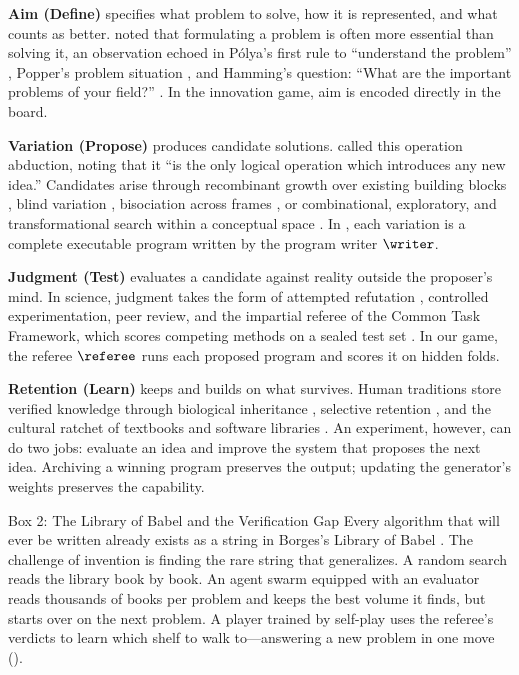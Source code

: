 \textbf{Aim (Define)} specifies what problem to solve, how it is represented, and what counts as better. \citet{einstein1938evolution} noted that formulating a problem is often more essential than solving it, an observation echoed in P\'{o}lya's first rule to ``understand the problem'' \citep{polya1945solve}, Popper's problem situation \citep{popper1963conjectures}, and Hamming's question: ``What are the important problems of your field?'' \citep{hamming1986research}. In the innovation game, aim is encoded directly in the board.

\textbf{Variation (Propose)} produces candidate solutions. \citet[CP 5.171]{peirce1934cp} called this operation abduction, noting that it ``is the only logical operation which introduces any new idea.'' Candidates arise through recombinant growth over existing building blocks \citep{weitzman1998recombinant,arthur2009nature}, blind variation \citep{campbell1960bvsr}, bisociation across frames \citep{koestler1964act}, or combinational, exploratory, and transformational search within a conceptual space \citep{boden1990creative,boden1998creativity}. In \EZ{}, each variation is a complete executable program written by the program writer $\writer$.

\textbf{Judgment (Test)} evaluates a candidate against reality outside the proposer's mind. In science, judgment takes the form of attempted refutation \citep{popper1959logic,popper1963conjectures}, controlled experimentation, peer review, and the impartial referee of the Common Task Framework, which scores competing methods on a sealed test set \citep{donoho2017fifty}. In our game, the referee $\referee$ runs each proposed program and scores it on hidden folds.

\textbf{Retention (Learn)} keeps and builds on what survives. Human traditions store verified knowledge through biological inheritance \citep{darwin1859origin}, selective retention \citep{campbell1960bvsr,simonton2011bvsr}, and the cultural ratchet of textbooks and software libraries \citep{tomasello1999cultural,ellis2021dreamcoder}. An experiment, however, can do two jobs: evaluate an idea and improve the system that proposes the next idea. Archiving a winning program preserves the output; updating the generator's weights preserves the capability.

\begin{explainer}{Box 2: The Library of Babel and the Verification Gap}\label{box:babel}
Every algorithm that will ever be written already exists as a string in Borges's Library of Babel \citep{borges1941babel}. The challenge of invention is finding the rare string that generalizes. A random search reads the library book by book. An agent swarm equipped with an evaluator reads thousands of books per problem and keeps the best volume it finds, but starts over on the next problem. A player trained by self-play uses the referee's verdicts to learn which shelf to walk to---answering a new problem in one move (\searchone{}).
\end{explainer}

